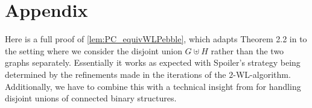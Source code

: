 \documentclass[10pt,a4paper]{article}
\newcommand{\WL}{\textrm {WL}}
\begin{document}
	\newpage
	

		\newpage
	
	

		\section{Appendix}
		\label{sec:appendix}

		
		Here is a full proof of \autoref{lem:PC_equivWLPebble}, which adapts Theorem 2.2 in \cite{sandraSiglog} to the setting where we consider the disjoint union $G \uplus H$ rather than the two graphs separately. Essentially it works as expected with Spoiler's strategy being determined by the refinements made in the iterations of the $2$-\WL-algorithm. Additionally, we have to combine this with a technical insight from \cite{dwl} for handling disjoint unions of connected binary structures.
		\restatePebbleLemma*
\end{document}
